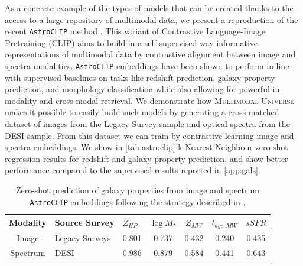 \documentclass[dvipsnames,table]{article}
\newcommand\pile{\textsc{Multimodal Universe}\xspace}
\begin{document}
As a concrete example of the types of models that can be created thanks to the access to a large repository of multimodal data, we present a reproduction of the recent \texttt{AstroCLIP} method \cite{Parker2024}. This variant of Contrastive Language-Image Pretraining (CLIP) \cite{CLIP2021} aims to build in a self-supervised way informative representations of multimodal data by contrastive alignment between image and spectra modalities. \texttt{AstroCLIP} embeddings have been shown to perform in-line with supervised baselines on tasks like redshift prediction, galaxy property prediction, and morphology classification while also allowing for powerful in-modality and cross-modal retrieval.
We demonstrate how \pile makes it possible to easily build such models by generating a cross-matched dataset of images from the Legacy Survey sample and optical spectra from the DESI sample. From this dataset we can train by contrastive learning image and spectra embeddings. We show in \autoref{tab:astroclip} k-Nearest Neighbour zero-shot regression results for redshift and galaxy property prediction, and show better performance compared to the supervised results reported in \autoref{app:gals}. 

\begin{table}%
    \centering
    \begin{threeparttable}
    \begin{tabular}{c l l c c c c}
        \toprule
        \cellcolor{white} Modality & \cellcolor{white} Source Survey & \cellcolor{white} $Z_{HP}$  & \cellcolor{white} $\log M_*$ & \cellcolor{white} $Z_{MW}$ & \cellcolor{white} $t_{age,MW}$ & \cellcolor{white} $sSFR$
         \\\midrule
          \cellcolor{white} Image & Legacy Surveys & 0.801 & 0.737 & 0.432 & 0.240 & 0.435  \\
          \cellcolor{white} Spectrum & DESI & 0.986 & 0.879 & 0.584 & 0.441 & 0.643 \\
        \bottomrule
    \end{tabular}
    \caption{Zero-shot prediction of galaxy properties from image and spectrum \texttt{AstroCLIP} embeddings following the strategy described in \citep{Parker2024}.}
    \label{tab:astroclip}
    \end{threeparttable}
\end{table}


\end{document}
